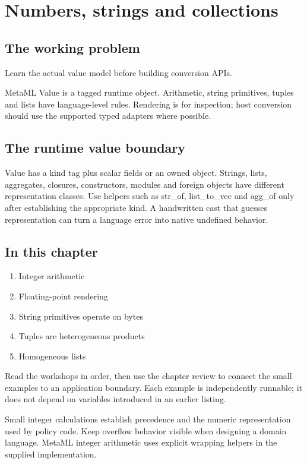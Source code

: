 \chapter{Numbers, strings and collections}\label{ch:14}
\section*{The working problem}
Learn the actual value model before building conversion APIs.

MetaML Value is a tagged runtime object. Arithmetic, string primitives, tuples and lists have language-level rules. Rendering is for inspection; host conversion should use the supported typed adapters where possible.

\section*{The runtime value boundary}
Value has a kind tag plus scalar fields or an owned object. Strings, lists, aggregates, closures, constructors, modules and foreign objects have different representation classes. Use helpers such as str\_of, list\_to\_vec and agg\_of only after establishing the appropriate kind. A handwritten cast that guesses representation can turn a language error into native undefined behavior.

\section*{In this chapter}
\begin{enumerate}
\item Integer arithmetic
\item Floating-point rendering
\item String primitives operate on bytes
\item Tuples are heterogeneous products
\item Homogeneous lists
\end{enumerate}
Read the workshops in order, then use the chapter review to connect the small examples to an application boundary. Each example is independently runnable; it does not depend on variables introduced in an earlier listing.

\clearpage
{}
Small integer calculations establish precedence and the numeric representation used by policy code. Keep overflow behavior visible when designing a domain language. MetaML integer arithmetic uses explicit wrapping helpers in the supplied implementation.

